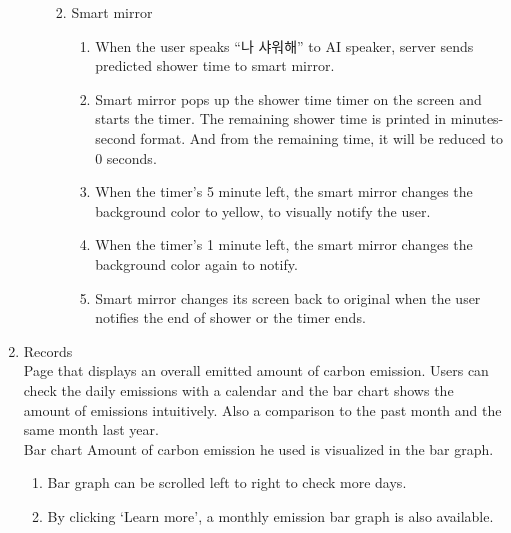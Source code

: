 \documentclass[11pt, conference]{IEEEtran}
\begin{document}
\begin{enumerate}[label=\arabic*]
\begin{enumerate}[label=\alph*]
\begin{enumerate}
\begin{enumerate}[label=\arabic*]
            \end{enumerate}
            \item Smart mirror
            \begin{enumerate}[label=\arabic*]
                \item When the user speaks “나 샤워해” to AI speaker, server sends predicted shower time to smart mirror.
                \item Smart mirror pops up the shower time timer on the screen and starts the timer. The remaining shower time is printed in minutes-second format. And from the remaining time, it will be reduced to 0 seconds.
                \item When the timer’s 5 minute left, the smart mirror changes the background color to yellow, to visually notify the user.
                \item When the timer’s 1 minute left, the smart mirror changes the background color again to notify.
                \item Smart mirror changes its screen back to original when the user notifies the end of shower or the timer ends.\\
            \end{enumerate}
        \end{enumerate}
    \end{enumerate}
    
    \item {\large{Records}}\\
    Page that displays an overall emitted amount of carbon emission. Users can check the daily emissions with a calendar and the bar chart shows the amount of emissions intuitively. Also a comparison to the past month and the same month last year.\\
    Bar chart \: Amount of carbon emission he used is visualized in the bar graph.
    \begin{enumerate}[label=\roman*]
        \item Bar graph can be scrolled left to right to check more days.
        \item By clicking ‘Learn more’, a monthly emission bar graph is also available. \\
    \end{enumerate}
    

\end{enumerate}
\end{document}
